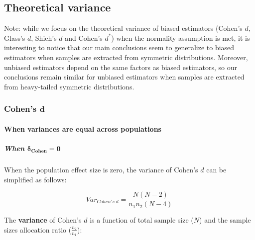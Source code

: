 \documentclass[
  english,
  man,mask]{apa6}
\let\oldparagraph\paragraph
\renewcommand{\paragraph}[1]{\oldparagraph{#1}\mbox{}}
\let\oldsubparagraph\subparagraph
\renewcommand{\subparagraph}[1]{\oldsubparagraph{#1}\mbox{}}
\begin{document}
\hypertarget{theoretical-variance}{%
\subsection{Theoretical variance}\label{theoretical-variance}}

Note: while we focus on the theoretical variance of biased estimators (Cohen's \(d\), Glass's \(d\), Shieh's \(d\) and Cohen's \(d^*\)) when the normality assumption is met, it is interesting to notice that our main conclusions seem to generalize to biased estimators when samples are extracted from symmetric distributions. Moreover, unbiased estimators depend on the same factors as biased estimators, so our conclusions remain similar for unbiased estimators when samples are extracted from heavy-tailed symmetric distributions.

\hypertarget{cohens-bmd}{%
\subsubsection{\texorpdfstring{Cohen's \(\bm{d}\)}{Cohen's \textbackslash bm\{d\}}}\label{cohens-bmd}}

\hypertarget{when-variances-are-equal-across-populations-2}{%
\paragraph{When variances are equal across populations}\label{when-variances-are-equal-across-populations-2}}

\hypertarget{when-bmdelta_cohen0}{%
\subparagraph{\texorpdfstring{When \(\bm{\delta_{Cohen}=0}\)}{When \textbackslash bm\{\textbackslash delta\_\{Cohen\}=0\}}}\label{when-bmdelta_cohen0}}

When the population effect size is zero, the variance of Cohen's \(d\) can be simplified as follows:

\[Var_{Cohen's \; d} = \frac{N(N-2)}{n_1n_2(N-4)}\]

The \textbf{variance} of Cohen's \(d\) is a function of total sample size (\(N\)) and the sample sizes allocation ratio (\(\frac{n_2}{n_1}\)):
\end{document}
